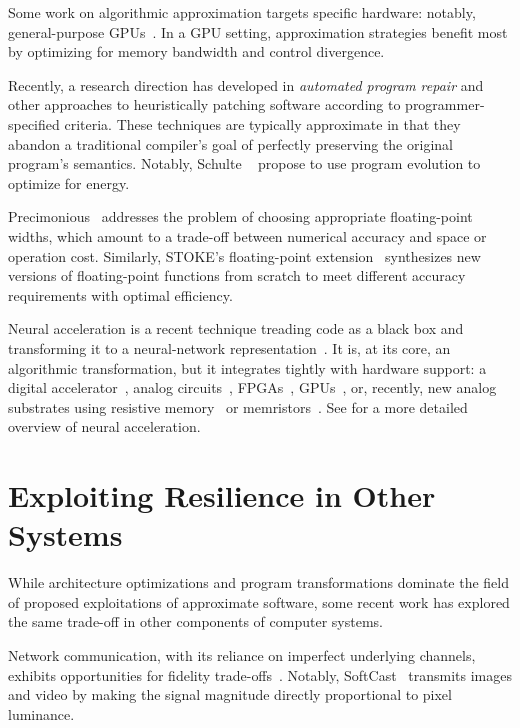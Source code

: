 Some work on algorithmic approximation targets specific hardware: notably,
general-purpose GPUs~\cite{paraprox, sage, herding, neuralgpu}.
In a GPU setting, approximation strategies benefit most by optimizing for
memory bandwidth and control divergence.

Recently, a research direction has developed in \emph{automated program
repair} and other approaches to heuristically patching software according to
programmer-specified criteria.
These techniques are typically approximate in that they abandon a traditional
compiler's goal of perfectly preserving the original program's semantics.
Notably, Schulte \etal~\cite{schulte} propose to use program evolution to
optimize for energy.

Precimonious~\cite{precimonious} addresses the problem of choosing appropriate
floating-point widths, which amount to a trade-off between numerical accuracy
and space or operation cost.
Similarly, STOKE's floating-point extension~\cite{stoke-fp} synthesizes new
versions of floating-point functions from scratch to meet different accuracy
requirements with optimal efficiency.

Neural acceleration is a recent technique treading code as a black box and
transforming it to a neural-network representation~\cite{npu, emeuro, benchnn,
temam-isca}.
It is, at its core, an algorithmic transformation, but it integrates tightly
with hardware support: a digital accelerator~\cite{npu}, analog
circuits~\cite{anpu}, FPGAs~\cite{snnap},
GPUs~\cite{neuralgpu}, or, recently, new analog substrates using
resistive memory~\cite{rram-npu} or memristors~\cite{memristor-npu}.
See  for a more detailed overview of neural acceleration.


\section{Exploiting Resilience in Other Systems}

While architecture optimizations and program transformations dominate the
field of proposed exploitations of approximate software, some recent work has
explored the same trade-off in other components of computer systems.

Network
communication, with its reliance on imperfect underlying channels, exhibits
opportunities for fidelity trade-offs~\cite{softcast, luo-globecom, apex,
smpmup2006}. Notably, SoftCast~\cite{softcast} transmits images and video by
making the signal magnitude directly proportional to pixel luminance.

